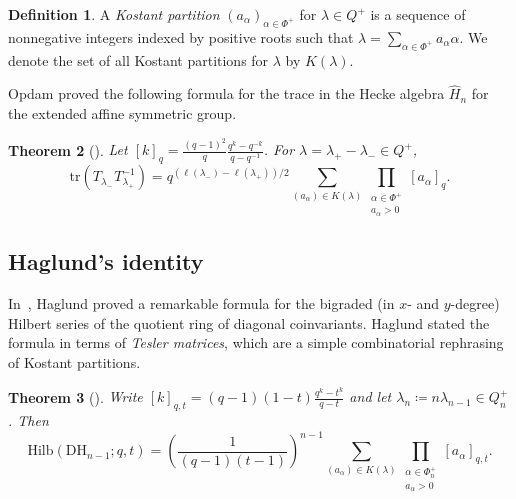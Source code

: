 \documentclass[a4paper,10pt,leqno]{amsart}
\newcommand{\darkred}{\color{darkred}}
\numberwithin{equation}{section}
\newtheorem{theorem}{Theorem}[section]
\theoremstyle{definition}
\newtheorem{definition}[theorem]{Definition}
\theoremstyle{remark}
\renewcommand{\S}{\textsc{sub}}
\renewcommand{\DH}{\mathrm{DH}}
\newcommand{\defn}[1]{\emph{\darkred #1}}
\newcounter{intege}
\begin{document}
\begin{definition}
A \defn{Kostant partition} $(a_\alpha)_{\alpha \in \Phi^+}$ for $\lambda \in Q^+$ is a sequence of nonnegative integers indexed by positive roots such that $\lambda=\sum_{\alpha \in \Phi^+} a_\alpha \alpha$.  We denote the set of all Kostant partitions for $\lambda$ by $K(\lambda)$.
\end{definition}

Opdam proved the following formula for the trace in the Hecke algebra $\widehat{H}_n$ for the extended affine symmetric group.
\begin{theorem}[{\cite[Cor.~1.18]{opdam2003generating}}] Let $[k]_q=\frac{(q-1)^2}{q} \frac{q^k-q^{-k}}{q-q^{-1}}$.  For $\lambda=\lambda_+-\lambda_- \in Q^+$,
\[\mathrm{tr}(T_{{\lambda_-}}^{\phantom{-1}} T_{{\lambda_+}}^{-1}) = q^{(\ell({\lambda_-})-\ell({\lambda_+}))/2}\sum_{(a_\alpha) \in K(\lambda)} \prod_{\substack{\alpha \in \Phi^+ \\ a_\alpha > 0}} [a_\alpha]_q.\]
\label{thm:opdam}
\end{theorem}





\subsection{Haglund's identity}
In~\cite{haglund2011polynomial}, Haglund proved a remarkable formula for the bigraded (in $x$- and $y$-degree) Hilbert series of the quotient ring of diagonal coinvariants.  Haglund stated the formula in terms of \emph{Tesler matrices}, which are a simple combinatorial rephrasing of Kostant partitions.   %

\begin{theorem}[{\cite[Corollary 1]{haglund2011polynomial}}]\label{thm:Haglund} Write $[k]_{q,t} = (q-1)(1-t)\frac{q^k-t^k}{q-t}$ and
let $\lambda_n \coloneqq n\lambda_{n-1} \in Q^+_n$.  Then
\[\mathrm{Hilb}(\DH_{n-1};q,t) = \left(\frac{1}{(q-1)(t-1)}\right)^{n-1}\sum_{(a_\alpha) \in K(\lambda)} \prod_{\substack{\alpha \in \Phi^+_n \\ a_\alpha > 0}} [a_\alpha]_{q,t}.\]
\end{theorem}
\end{document}
